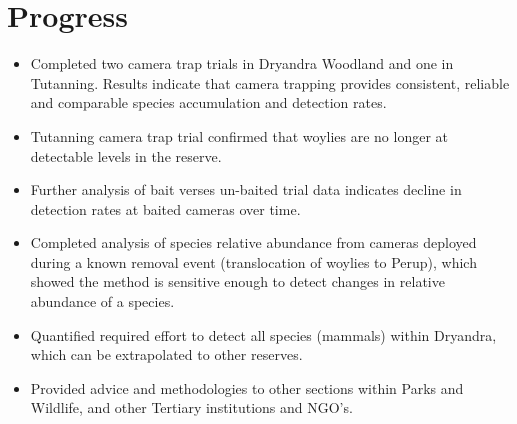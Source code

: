 \documentclass[version=last, paper=a4, DIV=18, usenames, dvipsnames]{scrartcl}
\begin{document}
\section*{Progress}
\begin{itemize}
\itemsep1pt\parskip0pt
\item
  Completed two camera trap trials in Dryandra Woodland and one in
  Tutanning. Results indicate that camera trapping provides consistent,
  reliable and comparable species accumulation and detection rates.
\item
  Tutanning camera trap trial confirmed that woylies are no longer at
  detectable levels in the reserve.
\item
  Further analysis of bait verses un-baited trial data indicates decline
  in detection rates at baited cameras over time.
\item
  Completed analysis of species relative abundance from cameras deployed
  during a known removal event (translocation of woylies to Perup),
  which showed the method is sensitive enough to detect changes in
  relative abundance of a species.
\item
  Quantified required effort to detect all species (mammals) within
  Dryandra, which can be extrapolated to other reserves.
\item
  Provided advice and methodologies to other sections within Parks and
  Wildlife, and other Tertiary institutions and NGO's.
\end{itemize}
\end{document}
